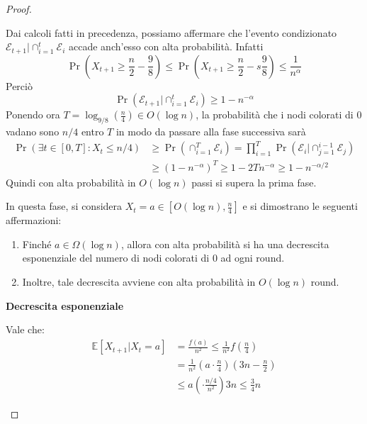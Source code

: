 \begin{teorema}
\begin{proof}
\begin{description}
            Dai calcoli fatti in precedenza, possiamo affermare che l'evento condizionato $\mathcal{E}_{t+1} | \cap_{i = 1}^t \mathcal{E}_i$ accade anch'esso con alta probabilità. Infatti
            \[
                \Pr\left( X_{t+1} \geq \frac{n}{2} - \frac{9}{8} \right) \leq \Pr\left( X_{t+1} \geq \frac{n}{2} - s\frac{9}{8} \right) \leq \frac{1}{n^{\alpha}}
            \]
            Perciò
            \[
                \Pr\left( \mathcal{E}_{t+1} | \cap_{i = 1}^t \mathcal{E}_i \right) \geq 1 - n^{-\alpha}
            \]
            Ponendo ora $T = \log_{9/8}(\frac{n}{4}) \in O(\log n)$, la probabilità che i nodi colorati di $0$ vadano sono $n/4$ entro $T$ in modo da passare alla fase successiva sarà
            \begin{align*}
                \Pr(\exists t \in [0,T]: X_t \leq n/4) &\geq \Pr\left( \cap_{i = 1}^T \mathcal{E}_i \right) = \prod_{i = 1}^{T} \Pr\left( \mathcal{E}_{i} | \cap_{j = 1}^{i-1} \mathcal{E}_j \right) \\ 
                &\geq (1 - n^{-\alpha})^T \geq 1 - 2Tn^{-\alpha} \geq 1 - n^{-\alpha/2}
            \end{align*}
            Quindi con alta probabilità in $O(\log n)$ passi si supera la prima fase.

            \item[FASE 2] In questa fase, si considera $X_t = a \in [O(\log n), \frac{n}{4}]$ e si dimostrano le seguenti affermazioni:
            \begin{enumerate}
                \item Finché $a \in \Omega(\log n)$, allora con alta probabilità si ha una decrescita esponenziale del numero di nodi colorati di $0$ ad ogni round.
                \item Inoltre, tale decrescita avviene con alta probabilità in $O(\log n)$ round.
            \end{enumerate}

            \textbf{Decrescita esponenziale}

            Vale che:
            \begin{align*}
                \mathbb{E}[X_{t+1} | X_t = a] 
                &= \frac{f(a)}{n^2} \leq \frac{1}{n^2}f\left(\frac{n}{4}\right) \\                
                &= \frac{1}{n^2}\left(a \cdot \frac{n}{4}\right) \left(3n - \frac{n}{2}\right) \\
                &\leq a\left(\cdot \frac{n/4}{n^2}\right)3n \leq \frac{3}{4}n 
            \end{align*}


\end{description}
\end{proof}
\end{teorema}
